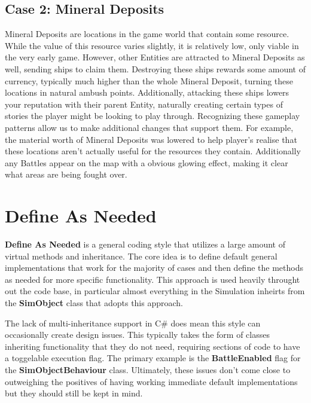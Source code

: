 \documentclass{report}
\begin{document}
\subsection{Case 2: Mineral Deposits}

Mineral Deposits are locations in the game world that contain some resource. While the value of this resource varies slightly, it is relatively low, only viable in the very early game. However, other Entities are attracted to Mineral Deposits as well, sending ships to claim them. Destroying these ships rewards some amount of currency, typically much higher than the whole Mineral Deposit, turning these locations in natural ambush points. Additionally, attacking these ships lowers your reputation with their parent Entity, naturally creating certain types of stories the player might be looking to play through.
\newline
\newline
Recognizing these gameplay patterns allow us to make additional changes that support them. For example, the material worth of Mineral Deposits was lowered to help player's realise that these locations aren't actually useful for the resources they contain. Additionally any Battles appear on the map with a obvious glowing effect, making it clear what areas are being fought over.

\section{Define As Needed}

\textbf{Define As Needed} is a general coding style that utilizes a large amount of virtual methods and inheritance. The core idea is to define default general implementations that work for the majority of cases and then define the methods as needed for more specific functionality. This approach is used heavily throught out the code base, in particular almost everything in the Simulation inheirts from the \textbf{SimObject} class that adopts this approach.

The lack of multi-inheritance support in C\# does mean this style can occasionally create design issues. This typically takes the form of classes inheriting functionality that they do not need, requiring sections of code to have a toggelable execution flag. The primary example is the \textbf{BattleEnabled} flag for the \textbf{SimObjectBehaviour} class. Ultimately, these issues don't come close to outweighing the positives of having working immediate default implementations but they should still be kept in mind.
\end{document}
